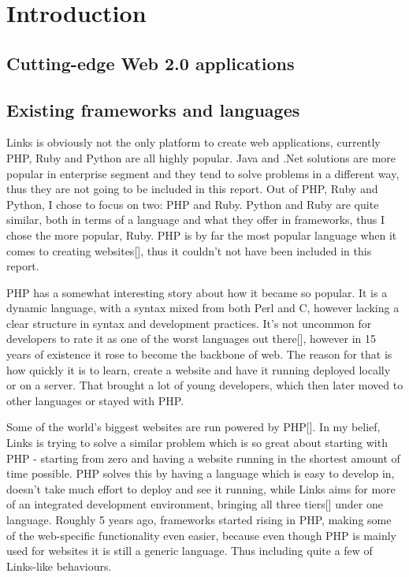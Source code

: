 
\chapter{Introduction}

\section{Cutting-edge Web 2.0 applications}

\section{Existing frameworks and languages}

Links is obviously not the only platform to create web applications, currently PHP, Ruby and Python are all highly popular. Java and .Net solutions are more popular in enterprise segment and they tend to solve problems in a different way, thus they are not going to be included in this report. Out of PHP, Ruby and Python, I chose to focus on two: PHP and Ruby. Python and Ruby are quite similar, both in terms of a language and what they offer in frameworks, thus I chose the more popular, Ruby. PHP is by far the most popular language when it comes to creating websites[], thus it couldn't not have been included in this report. 

PHP has a somewhat interesting story about how it became so popular. It is a dynamic language, with a syntax mixed from both Perl and C, however lacking a clear structure in syntax and development practices. It's not uncommon for developers to rate it as one of the worst languages out there[], however in 15 years of existence it rose to become the backbone of web. The reason for that is how quickly it is to learn, create a website and have it running deployed locally or on a server. That brought a lot of young developers, which then later moved to other languages or stayed with PHP. 

Some of the world's biggest websites are run powered by PHP[]. In my belief, Links is trying to solve a similar problem which is so great about starting with PHP - starting from zero and having a website running in the shortest amount of time possible. PHP solves this by having a language which is easy to develop in, doesn't take much effort to deploy and see it running, while Links aims for more of an integrated development environment, bringing all three tiers[] under one language. Roughly 5 years ago, frameworks started rising in PHP, making some of the web-specific functionality even easier, because even though PHP is mainly used for websites it is still a generic language. Thus including quite a few of Links-like behaviours. 

